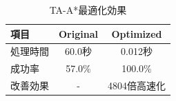 
\begin{table}[htbp]
\centering
\caption{TA-A*最適化効果}
\label{tab:tastar_optimization}
\begin{tabular}{lcc}
\hline
項目 & Original & Optimized \\ \hline
処理時間 & 60.0秒 & 0.012秒 \\
成功率 & 57.0\% & 100.0\% \\
改善効果 & - & 4804倍高速化 \\ \hline
\end{tabular}
\end{table}
